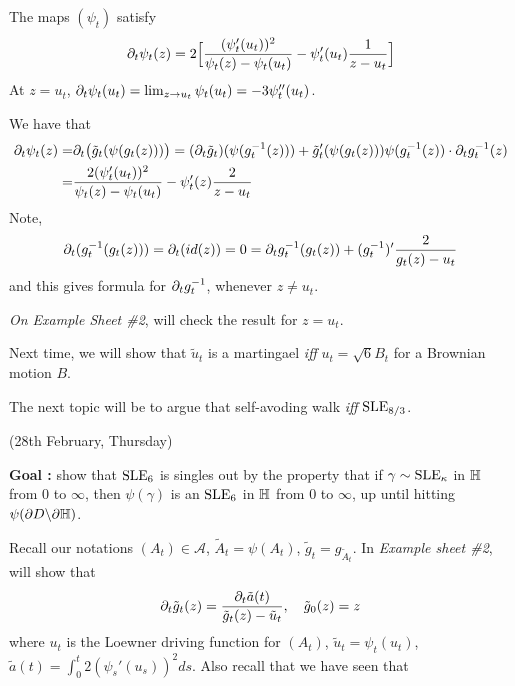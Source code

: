 \documentclass[12pt,a4paper]{article}
\newenvironment{proof}
{\begin{changemargin}{0.5cm}{0.5cm} 
	}%
	{\end{changemargin}
}
\newenvironment{p}
{\begin{proof} 
	}%
	{\end{proof}
}
\begin{document}
\prop The maps $(\psi_t)$ satisfy
\begin{align*}
\partial_t \psi_t(z) = 2\Big[ \frac{(\psi'_t(u_t))^2}{\psi_t(z) - \psi_t(u_t)} - \psi'_t(u_t) \frac{1}{z-u_t}\Big]
\end{align*}
At $z= u_t$, $\partial_t \psi_t(u_t) = \lim_{z\rightarrow u_t} \psi_t(u_t) = -3\psi''_t(u_t)$.
\begin{p}
\pf We have that
\begin{align*}
\partial_t \psi_t(z) =& \partial_t \big( \tilde{g}_t (\psi(g_t(z)))\big) = (\partial_t \tilde{g}_t)(\psi(g_t^{-1}(z))) + \tilde{g}'_t (\psi(g_t(z))) \psi( g_t^{-1}(z) ) \cdot \partial_t g_t^{-1}(z) \\
=& \frac{2 (\psi'_t(u_t))^2}{\psi_t(z) - \psi_t(u_t)} -\psi'_t(z) \frac{2}{z-u_t}
\end{align*}
Note,
\begin{align*}
\partial_t (g_t^{-1}(g_t(z))) = \partial_t (id(z)) =0 = \partial_t g_t^{-1} (g_t(z)) + (g_t^{-1})' \frac{2}{g_t(z) - u_t}
\end{align*}
and this gives formula for $\partial_t g_t^{-1}$, whenever $z\neq u_t$.
\s

\emph{On Example Sheet \#2}, will check the result for $z= u_t$.

\eop 
\end{p}
\s

Next time, we will show that $\tilde{u}_t$ is a martingael \emph{iff} $u_t = \sqrt{6}B_t$ for a Brownian motion $B$.

\quad The next topic will be to argue that self-avoding walk \emph{iff} $\text{SLE}_{8/3}$.
\s

\newday

(28th February, Thursday)
\s

\textbf{Goal :} show that $\text{SLE}_{6}$ is singles out by the property that if $\gamma \sim \text{SLE}_{\kappa}$ in $\mathbb{H}$ from $0$ to $\infty$, then $\psi(\gamma)$ is an $\text{SLE}_{6}$ in $\mathbb{H}$ from $0$ to $\infty$, up until hitting $\psi(\partial D \backslash \partial \mathbb{H})$. 

Recall our notations $(A_t) \in \mathscr{A}$, $\tilde{A}_t = \psi(A_t)$, $\tilde{g}_t = g_{\tilde{A}_t}$. In \emph{Example sheet \#2}, will show that 
\begin{align*}
\partial_t \tilde{g}_t(z) = \frac{\partial_t \tilde{a}(t)}{\tilde{g}_t(z) - \tilde{u}_t}, \quad \tilde{g}_0 (z) = z 
\end{align*} 
where $u_t$ is the Loewner driving function for $(A_t)$, $\tilde{u}_t = \psi_t(u_t)$, $\tilde{a}(t) = \int_0^t 2(\psi_s'(u_s))^2 ds$. Also recall that we have seen that 
\end{document}
